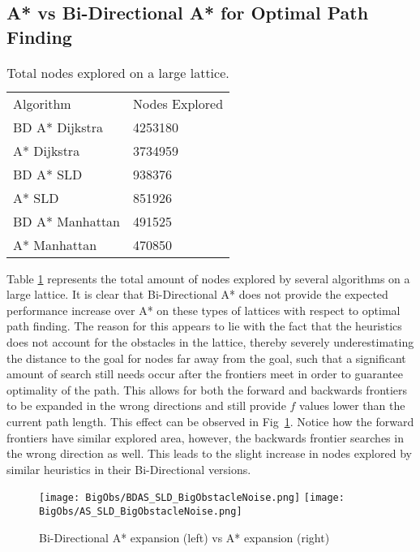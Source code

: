 \documentclass[conference]{IEEEtran}
\begin{document}
\subsection{A* vs Bi-Directional A* for Optimal Path Finding}

\begin{table}[ht]
\begin{tabular}{ll}
Algorithm           & Nodes Explored     \\
BD A* Dijkstra      & 4253180         \\
A* Dijkstra         & 3734959               \\
BD A* SLD           & 938376             \\
A* SLD              & 851926               \\
BD A* Manhattan     & 491525               \\
A* Manhattan        & 470850               \\

\end{tabular}
\caption{Total nodes explored on a large lattice.}
\label{tab:BN}
\end{table}

Table \ref{tab:BN} represents the total amount of nodes explored by several algorithms on a large lattice. It is clear that Bi-Directional A* does not provide the expected performance increase over A* on these types of lattices with respect to optimal path finding. The reason for this appears to lie with the fact that the heuristics does not account for the obstacles in the lattice, thereby severely underestimating the distance to the goal for nodes far away from the goal, such that a significant amount of search still needs occur after the frontiers meet in order to guarantee optimality of the path. This allows for both the forward and backwards frontiers to be expanded in the wrong directions and still provide $f$ values lower than the current path length. This effect can be observed in Fig~\ref{fig:BDWrongDir}. Notice how the forward frontiers have similar explored area, however, the backwards frontier searches in the wrong direction as well. This leads to the slight increase in nodes explored by similar heuristics in their Bi-Directional versions.

\begin{figure}[ht]
    \centering
     \texttt{[image: BigObs/BDAS\_SLD\_BigObstacleNoise.png]}
     \texttt{[image: BigObs/AS\_SLD\_BigObstacleNoise.png]}
    \caption{Bi-Directional A* expansion (left) vs A* expansion (right) }    
    \label{fig:BDWrongDir}
\end{figure}
\end{document}
